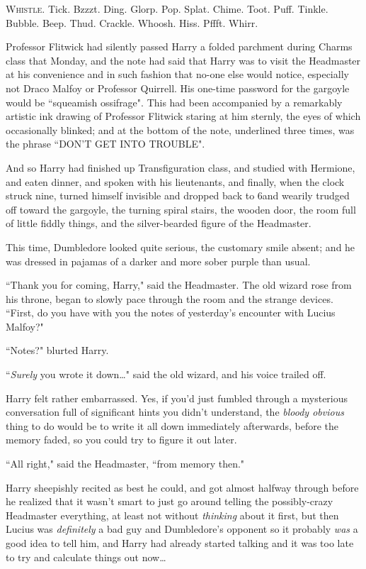 
\lettrine{W}{histle.} Tick. Bzzzt. Ding. Glorp. Pop. Splat. Chime. Toot. Puff. Tinkle. Bubble. Beep. Thud. Crackle. Whoosh. Hiss. Pffft. Whirr.

Professor Flitwick had silently passed Harry a folded parchment during Charms class that Monday, and the note had said that Harry was to visit the Headmaster at his convenience and in such fashion that no-one else would notice, especially not Draco Malfoy or Professor Quirrell. His one-time password for the gargoyle would be ``squeamish ossifrage". This had been accompanied by a remarkably artistic ink drawing of Professor Flitwick staring at him sternly, the eyes of which occasionally blinked; and at the bottom of the note, underlined three times, was the phrase ``DON'T GET INTO TROUBLE".

And so Harry had finished up Transfiguration class, and studied with Hermione, and eaten dinner, and spoken with his lieutenants, and finally, when the clock struck nine, turned himself invisible and dropped back to 6\pm and wearily trudged off toward the gargoyle, the turning spiral stairs, the wooden door, the room full of little fiddly things, and the silver-bearded figure of the Headmaster.

This time, Dumbledore looked quite serious, the customary smile absent; and he was dressed in pajamas of a darker and more sober purple than usual.

``Thank you for coming, Harry," said the Headmaster. The old wizard rose from his throne, began to slowly pace through the room and the strange devices. ``First, do you have with you the notes of yesterday's encounter with Lucius Malfoy?"

``Notes?" blurted Harry.

``\emph{Surely} you wrote it down{\ldots}" said the old wizard, and his voice trailed off.

Harry felt rather embarrassed. Yes, if you'd just fumbled through a mysterious conversation full of significant hints you didn't understand, the \emph{bloody obvious} thing to do would be to write it all down immediately afterwards, before the memory faded, so you could try to figure it out later.

``All right," said the Headmaster, ``from memory then."

Harry sheepishly recited as best he could, and got almost halfway through before he realized that it wasn't smart to just go around telling the possibly-crazy Headmaster everything, at least not without \emph{thinking} about it first, but then Lucius was \emph{definitely} a bad guy and Dumbledore's opponent so it probably \emph{was} a good idea to tell him, and Harry had already started talking and it was too late to try and calculate things out now{\ldots}

